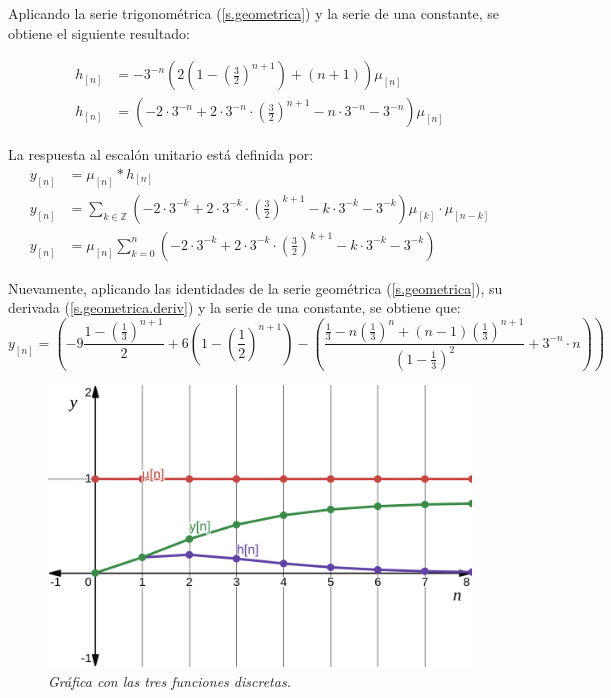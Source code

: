 \documentclass[a4paper,12pt]{report}
\begin{document}
\begin{enumerate}[label=\alph*), left=0pt]
    Aplicando la serie trigonométrica (\ref{s.geometrica}) y la serie de una constante, se obtiene el siguiente
    resultado:

    \begin{align*}
      h_{[n]} &= -3^{-n} \left(2\left(1 - \left(\frac{3}{2}\right)^{n+1} \right) + (n+1)\right) \mu_{[n]}\\[6pt]
      h_{[n]} &= \left(-2 \cdot 3^{-n} + 2 \cdot 3^{-n} \cdot \left(\frac{3}{2}\right)^{n+1} -
      n \cdot 3^{-n} - 3^{-n}\right)\mu_{[n]}
    \end{align*}

    La respuesta al escalón unitario está definida por:
    \begin{align*}
      y_{[n]} &= \mu_{[n]} * h_{[n]}\\[6pt]
      y_{[n]} &= \sum_{k \in \mathbb{Z}} \left(-2 \cdot 3^{-k} + 2 \cdot 3^{-k} \cdot \left(\frac{3}{2}\right)^{k+1} -
      k \cdot 3^{-k} - 3^{-k}\right)\mu_{[k]} \cdot \mu_{[n-k]}\\[6pt]
        y_{[n]} &= \mu_{[n]} \sum_{k=0}^n \left(-2 \cdot 3^{-k} + 2 \cdot 3^{-k} \cdot \left(\frac{3}{2}\right)^{k+1} -
        k \cdot 3^{-k} - 3^{-k}\right)
    \end{align*}

    Nuevamente, aplicando las identidades de la serie geométrica (\ref{s.geometrica}), su derivada (\ref{s.geometrica.deriv})
    y la serie de una constante, se obtiene que:
    \begin{equation*}
      y_{[n]} = \left(-9 \frac{1-\left(\frac{1}{3}\right)^{n+1}}{2} + 6 \left(1 - \left(\frac{1}{2}\right)^{n+1}\right) -
        \left(\frac{\frac{1}{3} - n\left(\frac{1}{3}\right)^{n} + (n-1) \left(\frac{1}{3}\right)^{n+1}}{\left(1-\frac{1}{3}\right)^{2}}+3^{-n}\cdot n\right)\right)
    \end{equation*}

    \begin{figure}[H]
      \centering
      \begin{minipage}{0.55\textwidth}
        \centering
        \includegraphics[width=1\textwidth]{./images/ej2.2.png}
        \textit{Gráfica con las tres funciones discretas.}
      \end{minipage}
    \end{figure}

\end{enumerate}
\end{document}

